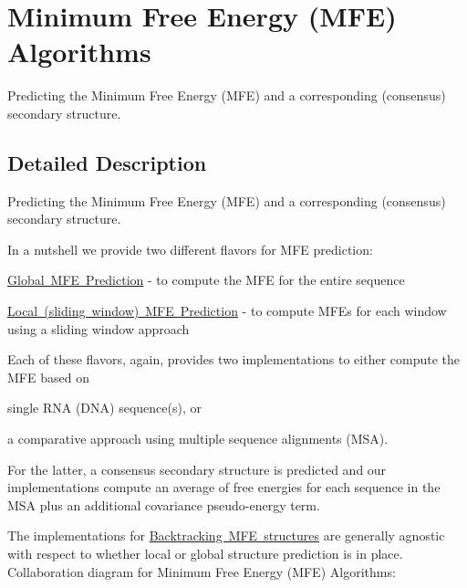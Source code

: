 \hypertarget{group__mfe}{}\section{Minimum Free Energy (M\+FE) Algorithms}
\label{group__mfe}


Predicting the Minimum Free Energy (M\+FE) and a corresponding (consensus) secondary structure.  




\subsection{Detailed Description}
Predicting the Minimum Free Energy (M\+FE) and a corresponding (consensus) secondary structure. 

In a nutshell we provide two different flavors for M\+FE prediction\+:
\begin{DoxyItemize}
\item \mbox{\hyperlink{group__mfe__global}{Global M\+FE Prediction}} -\/ to compute the M\+FE for the entire sequence
\item \mbox{\hyperlink{group__mfe__window}{Local (sliding window) M\+FE Prediction}} -\/ to compute M\+F\+Es for each window using a sliding window approach
\end{DoxyItemize}

Each of these flavors, again, provides two implementations to either compute the M\+FE based on
\begin{DoxyItemize}
\item single R\+NA (D\+NA) sequence(s), or
\item a comparative approach using multiple sequence alignments (M\+SA).
\end{DoxyItemize}

For the latter, a consensus secondary structure is predicted and our implementations compute an average of free energies for each sequence in the M\+SA plus an additional covariance pseudo-\/energy term.

The implementations for \mbox{\hyperlink{group__mfe__backtracking}{Backtracking M\+FE structures}} are generally agnostic with respect to whether local or global structure prediction is in place. Collaboration diagram for Minimum Free Energy (M\+FE) Algorithms\+:
